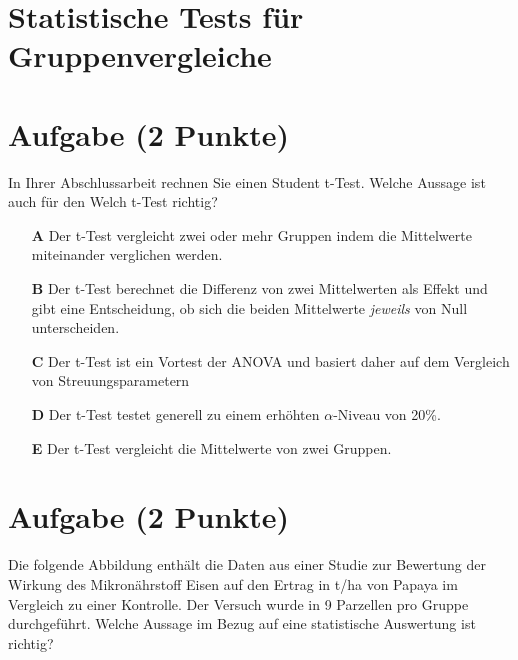 \documentclass[a4paper, 9pt]{scrartcl}\usepackage[]{graphicx}\usepackage[]{xcolor}
\begin{document}
\section*{Statistische Tests für Gruppenvergleiche} 

\section{Aufgabe \hfill (2 Punkte)}



In Ihrer Abschlussarbeit rechnen Sie einen Student t-Test. Welche Aussage ist auch für den Welch t-Test richtig?



\begin{enumerate}
\item [\textbf{A} \msquare] Der t-Test vergleicht zwei oder mehr Gruppen indem die Mittelwerte miteinander verglichen werden.
\item [\textbf{B} \msquare] Der t-Test berechnet die Differenz von zwei Mittelwerten als Effekt und gibt eine Entscheidung, ob sich die beiden Mittelwerte \textit{jeweils} von Null unterscheiden.
\item [\textbf{C} \msquare] Der t-Test ist ein Vortest der ANOVA und basiert daher auf dem Vergleich von Streuungsparametern
\item [\textbf{D} \msquare] Der t-Test testet generell zu einem erhöhten $\alpha$-Niveau von 20\%.
\item [\textbf{E} \msquare] Der t-Test vergleicht die Mittelwerte von zwei Gruppen.
\end{enumerate}

\section{Aufgabe \hfill (2 Punkte)}



Die folgende Abbildung enthält die Daten aus einer Studie zur Bewertung der Wirkung des Mikronährstoff Eisen auf den Ertrag in t/ha von Papaya im Vergleich zu einer Kontrolle. Der Versuch wurde in 9 Parzellen pro Gruppe durchgeführt. Welche Aussage im Bezug auf eine statistische Auswertung ist richtig?
\end{document}
